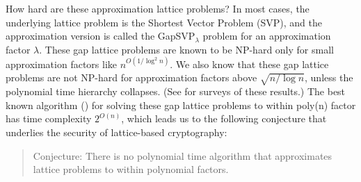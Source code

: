 \documentclass[../main.tex]{subfiles}
\begin{document}
How hard are these approximation lattice problems?
In most cases, the underlying lattice problem is the Shortest Vector Problem (SVP), and the approximation version is called the GapSVP$_{\lambda}$ problem for an approximation factor $\lambda$.
These gap lattice problems are known to be NP-hard only for small approximation factors like $n^{O(1/\log^2 n)}$.
We also know that these gap lattice problems are not NP-hard for approximation factors above $\sqrt{n/\log n}$, unless the polynomial time hierarchy collapses. (See \cite{micciancio-goldwasser02,khot05,khot10} for surveys of these results.)
The best known algorithm (\cite{ajtaiKS01}) for solving these gap lattice problems to within poly(n) factor has time complexity $2^{O(n)}$, which leads us to the following conjecture that underlies the security of lattice-based cryptography:
\begin{quote}
    Conjecture: There is no polynomial time algorithm that approximates lattice problems to within polynomial factors.
\end{quote}

% 



\end{document}
